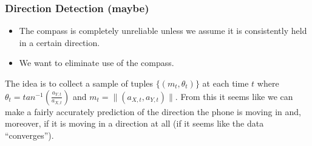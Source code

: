 \documentclass{beamer}
\begin{document}

\begin{frame}
  \frametitle{Direction Detection (maybe)}
  \begin{itemize}
  \item The compass is completely unreliable unless we assume it is
    consistently held in a certain direction.
  \item We want to eliminate use of the compass.
  \end{itemize}
  The idea is to collect a sample of tuples $\{\left(m_t,
    \theta_t\right)\}$ at each time $t$ where $\theta_t =
  tan^{-1}(\frac{a_{Y,t}}{a_{X,t}})$ and $m_t = \|(a_{X,t},
  a_{Y,t})\|$. From this it seems like we can make a fairly accurately
  prediction of the direction the phone is moving in and, moreover, if
  it is moving in a direction at all (if it seems like the data
  ``converges'').
\end{frame}

\end{document}
